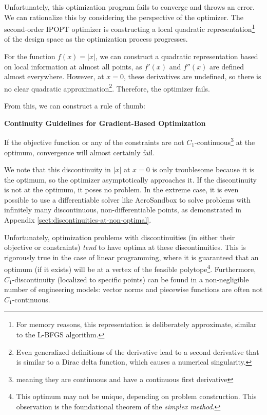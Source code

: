 Unfortunately, this optimization program fails to converge and throws an error. We can rationalize this by considering the perspective of the optimizer. The second-order IPOPT optimizer is constructing a local quadratic representation\footnote{For memory reasons, this representation is deliberately approximate, similar to the L-BFGS algorithm.} of the design space as the optimization process progresses.

For the function $f(x) = |x|$, we can construct a quadratic representation based on local information at almost all points, as $f'(x)$ and $f''(x)$ are defined almost everywhere. However, at $x=0$, these derivatives are undefined, so there is no clear quadratic approximation\footnote{Even generalized definitions of the derivative lead to a second derivative that is similar to a Dirac delta function, which causes a numerical singularity.}. Therefore, the optimizer fails.

From this, we can construct a rule of thumb:

\begin{example}
    \noindent
    \textbf{Continuity Guidelines for Gradient-Based Optimization}

    \noindent
    If the objective function or any of the constraints are not $C_1$-continuous\footnote{meaning they are continuous and have a continuous first derivative} at the optimum, convergence will almost certainly fail.
\end{example}

We note that this discontinuity in $|x|$ at $x=0$ is only troublesome because it is the optimum, so the optimizer asymptotically approaches it. If the discontinuity is not at the optimum, it poses no problem. In the extreme case, it is even possible to use a differentiable solver like AeroSandbox to solve problems with infinitely many discontinuous, non-differentiable points, as demonstrated in Appendix \ref{sect:discontinuities-at-non-optimal}.

Unfortunately, optimization problems with discontinuities (in either their objective or constraints) \textit{tend} to have optima at these discontinuities. This is rigorously true in the case of linear programming, where it is guaranteed that an optimum (if it exists) will be at a vertex of the feasible polytope\footnote{This optimum may not be unique, depending on problem construction. This observation is the foundational theorem of the \textit{simplex method}.}. Furthermore, $C_1$-discontinuity (localized to specific points) can be found in a non-negligible number of engineering models: vector norms and piecewise functions are often not $C_1$-continuous.

